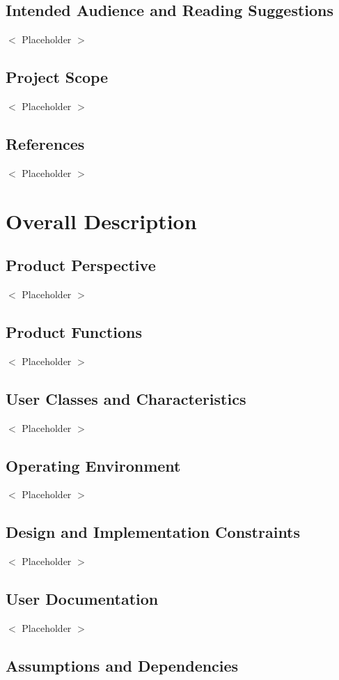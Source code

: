 \documentclass{scrreprt}
\begin{document}
\section{Intended Audience and Reading Suggestions}
$<$ Placeholder $>$

\section{Project Scope}
$<$ Placeholder $>$

\section{References}
$<$ Placeholder $>$


\chapter{Overall Description}

\section{Product Perspective}
$<$ Placeholder $>$

\section{Product Functions}
$<$ Placeholder $>$

\section{User Classes and Characteristics}
$<$ Placeholder $>$

\section{Operating Environment}
$<$ Placeholder $>$

\section{Design and Implementation Constraints}
$<$ Placeholder $>$

\section{User Documentation}
$<$ Placeholder $>$
\section{Assumptions and Dependencies}
\end{document}
